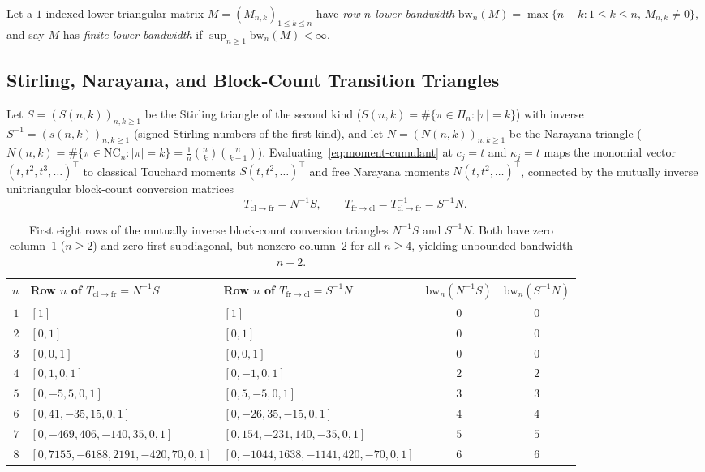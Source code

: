 \documentclass[11pt,a4paper]{article}
\theoremstyle{definition}
\theoremstyle{remark}
\newcommand{\NC}{\mathrm{NC}}
\newcommand{\cl}{\mathrm{cl}}
\newcommand{\fr}{\mathrm{fr}}
\begin{document}
Let a $1$-indexed lower-triangular matrix $M = (M_{n,k})_{1 \le k \le n}$ have \emph{row-$n$ lower bandwidth} $\mathrm{bw}_n(M) = \max\{n - k : 1 \le k \le n,\, M_{n,k} \ne 0\}$, and say $M$ has \emph{finite lower bandwidth} if $\sup_{n \ge 1} \mathrm{bw}_n(M) < \infty$.

\subsection{Stirling, Narayana, and Block-Count Transition Triangles}

Let $S = (S(n,k))_{n,k \ge 1}$ be the Stirling triangle of the second kind ($S(n,k) = \#\{\pi \in \Pi_n : |\pi| = k\}$) with inverse $S^{-1} = (s(n,k))_{n,k \ge 1}$ (signed Stirling numbers of the first kind), and let $N = (N(n,k))_{n,k \ge 1}$ be the Narayana triangle ($N(n,k) = \#\{\pi \in \NC_n : |\pi| = k\} = \frac{1}{n}\binom{n}{k}\binom{n}{k-1}$). Evaluating~\eqref{eq:moment-cumulant} at $c_j = t$ and $\kappa_j = t$ maps the monomial vector $(t, t^2, t^3, \dots)^\top$ to classical Touchard moments $S(t,t^2,\dots)^\top$ and free Narayana moments $N(t,t^2,\dots)^\top$, connected by the mutually inverse unitriangular block-count conversion matrices
\[
  T_{\cl\to\fr} = N^{-1} S, \qquad T_{\fr\to\cl} = T_{\cl\to\fr}^{-1} = S^{-1} N.
\]

\begin{table}[ht]
\centering
\footnotesize
\setlength{\tabcolsep}{3.8pt}
\begin{tabular}{@{}rllcc@{}}
\hline
$n$ & Row $n$ of $T_{\cl\to\fr} = N^{-1}S$ & Row $n$ of $T_{\fr\to\cl} = S^{-1}N$ & $\mathrm{bw}_n(N^{-1}S)$ & $\mathrm{bw}_n(S^{-1}N)$ \\
\hline
$1$ & $[1]$ & $[1]$ & $0$ & $0$ \\
$2$ & $[0, 1]$ & $[0, 1]$ & $0$ & $0$ \\
$3$ & $[0, 0, 1]$ & $[0, 0, 1]$ & $0$ & $0$ \\
$4$ & $[0, 1, 0, 1]$ & $[0, -1, 0, 1]$ & $2$ & $2$ \\
$5$ & $[0, -5, 5, 0, 1]$ & $[0, 5, -5, 0, 1]$ & $3$ & $3$ \\
$6$ & $[0, 41, -35, 15, 0, 1]$ & $[0, -26, 35, -15, 0, 1]$ & $4$ & $4$ \\
$7$ & $[0, -469, 406, -140, 35, 0, 1]$ & $[0, 154, -231, 140, -35, 0, 1]$ & $5$ & $5$ \\
$8$ & $[0, 7155, -6188, 2191, -420, 70, 0, 1]$ & $[0, -1044, 1638, -1141, 420, -70, 0, 1]$ & $6$ & $6$ \\
\hline
\end{tabular}
\caption{First eight rows of the mutually inverse block-count conversion triangles $N^{-1}S$ and $S^{-1}N$. Both have zero column~$1$ ($n \ge 2$) and zero first subdiagonal, but nonzero column~$2$ for all $n \ge 4$, yielding unbounded bandwidth $n - 2$.}
\label{tab:triangles}
\end{table}
\end{document}
